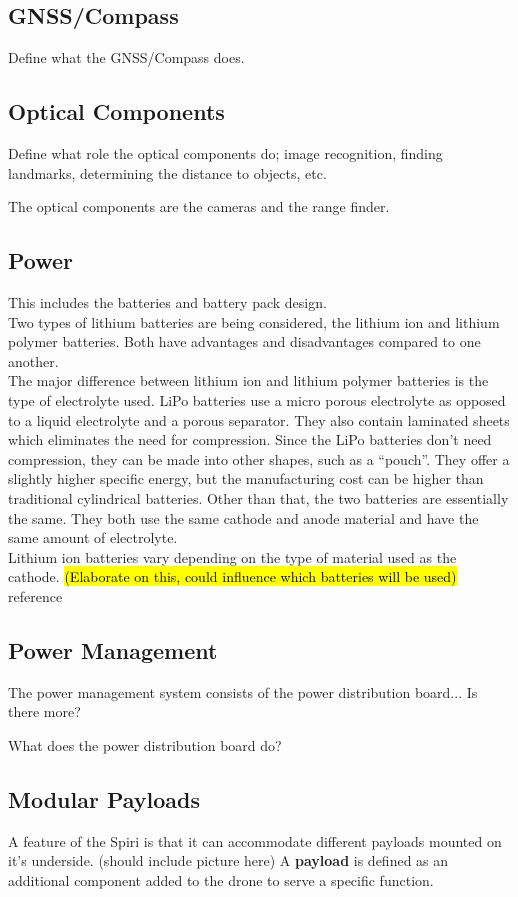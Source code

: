 \subsection{GNSS/Compass}
Define what the GNSS/Compass does.

\subsection{Optical Components}
Define what role the optical components do; image recognition, finding landmarks, determining the distance to objects, etc. 

The optical components are the cameras and the range finder.

\subsection{Power}

This includes the batteries and battery pack design. \\

Two types of lithium batteries are being considered, the lithium ion and lithium polymer batteries. Both have advantages and disadvantages compared to one another. \\

The major difference between lithium ion and lithium polymer batteries is the type of electrolyte used. LiPo batteries use a micro porous electrolyte as opposed to a liquid electrolyte and a porous separator. They also contain laminated sheets which eliminates the need for compression. Since the LiPo batteries don’t need compression, they can be made into other shapes, such as a “pouch”. They offer a slightly higher specific energy, but the manufacturing cost can be higher than traditional cylindrical batteries. Other than that, the two batteries are essentially the same. They both use the same cathode and anode material and have the same amount of electrolyte. \\

Lithium ion batteries vary depending on the type of material used as the cathode. \hl{(Elaborate on this, could influence which batteries will be used)} reference\\



\subsection{Power Management}
The power management system consists of the power distribution board... Is there more?



What does the power distribution board do?

\subsection{Modular Payloads}
A feature of the Spiri is that it can accommodate different payloads mounted on it's underside. (should include picture here) A \textbf{payload} is defined as an additional component added to the drone to serve a specific function.
